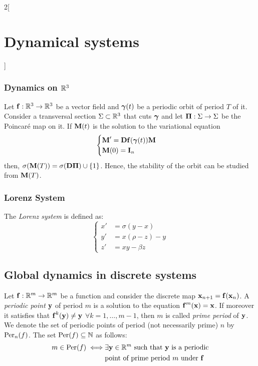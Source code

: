 \documentclass[../../../main_math.tex]{subfiles}
\begin{document}
\begin{multicols}{2}[\section{Dynamical systems}]
  \subsubsection{Dynamics on \texorpdfstring{$\mathbb{R}^3$}{R3}}
  \begin{proposition}
    Let $\boldsymbol{\mathrm{f}}:\mathbb{R}^3\rightarrow\mathbb{R}^3$ be a vector field and $\boldsymbol{\mathrm{\gamma}}(t)$ be a periodic orbit of period $T$ of it. Consider a transversal section $\Sigma\subset \mathbb{R}^3$ that cuts $\boldsymbol{\mathrm{\gamma}}$ and let $\boldsymbol{\mathrm{\Pi}}:\Sigma\rightarrow\Sigma$ be the Poincaré map on it. If $\boldsymbol{\mathrm{M}}(t)$ is the solution to the variational equation
    $$
      \begin{cases}
        \boldsymbol{\mathrm{M}}'      =\boldsymbol{\mathrm{D}}\boldsymbol{\mathrm{f}}(\boldsymbol{\mathrm{\gamma}}(t))\boldsymbol{\mathrm{M}} \\
        \boldsymbol{\mathrm{M}}(0)  =\boldsymbol{\mathrm{I}}_n
      \end{cases}
    $$
    then, $\sigma(\boldsymbol{\mathrm{M}}(T))=\sigma(\boldsymbol{\mathrm{D\Pi}})\cup\{1\}$. Hence, the stability of the orbit can be studied from $\boldsymbol{\mathrm{M}}(T)$.
  \end{proposition}
  \subsubsection{Lorenz System}
  \begin{definition}
    The \emph{Lorenz system} is defined as:
    $$
      \left\{
      \begin{aligned}
        x' & =\sigma(y-x)   \\
        y' & = x(\rho-z) -y \\
        z' & = xy -\beta z
      \end{aligned}
      \right.
    $$
  \end{definition}
  \subsection{Global dynamics in discrete systems}
  \begin{definition}
    Let $\boldsymbol{\mathrm{f}}:\mathbb{R}^m\rightarrow\mathbb{R}^m$ be a function and consider the discrete map $\boldsymbol{\mathrm{x}}_{n+1}=\boldsymbol{\mathrm{f}}(\boldsymbol{\mathrm{x}}_n)$. A \emph{periodic point} $\boldsymbol{\mathrm{y}}$ of period $m$ is a solution to the equation $\boldsymbol{\mathrm{f}}^m(\boldsymbol{\mathrm{x}})=\boldsymbol{\mathrm{x}}$. If moreover it satisfies that $\boldsymbol{\mathrm{f}}^k(\boldsymbol{\mathrm{y}})\ne\boldsymbol{\mathrm{y}}$ $\forall k=1,\ldots,m-1$, then $m$ is called \emph{prime period} of $\boldsymbol{\mathrm{y}}$. We denote the set of periodic points of period (not necessarily prime) $n$ by $\operatorname{Per}_n(f)$. The set $\operatorname{Per}(f)\subseteq\mathbb{N}$ as follows:
    \begin{align*}
      m\in\operatorname{Per}(f)\iff & \exists\boldsymbol{\mathrm{y}}\in\mathbb{R}^m\text{ such that $\boldsymbol{\mathrm{y}}$ is a periodic} \\
                      & \text{point of prime period $m$ under $\boldsymbol{\mathrm{f}}$}
    \end{align*}
  \end{definition}

\end{multicols}
\end{document}
